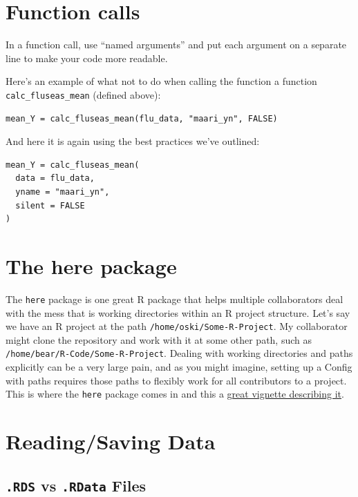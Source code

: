 \documentclass[]{book}
\begin{document}
\section{Function calls}\label{function-calls}

In a function call, use ``named arguments'' and put each argument on a
separate line to make your code more readable.

Here's an example of what not to do when calling the function a function
\texttt{calc\_fluseas\_mean} (defined above):

\begin{verbatim}
mean_Y = calc_fluseas_mean(flu_data, "maari_yn", FALSE)
\end{verbatim}

And here it is again using the best practices we've outlined:

\begin{verbatim}
mean_Y = calc_fluseas_mean(
  data = flu_data, 
  yname = "maari_yn",
  silent = FALSE
)
\end{verbatim}

\section{The here package}\label{the-here-package}

The \texttt{here} package is one great R package that helps multiple
collaborators deal with the mess that is working directories within an R
project structure. Let's say we have an R project at the path
\texttt{/home/oski/Some-R-Project}. My collaborator might clone the
repository and work with it at some other path, such as
\texttt{/home/bear/R-Code/Some-R-Project}. Dealing with working
directories and paths explicitly can be a very large pain, and as you
might imagine, setting up a Config with paths requires those paths to
flexibly work for all contributors to a project. This is where the
\texttt{here} package comes in and this a
\href{https://github.com/jennybc/here_here}{great vignette describing
it}.

\section{Reading/Saving Data}\label{readingsaving-data}

\subsection{\texorpdfstring{\texttt{.RDS} vs \texttt{.RData}
Files}{.RDS vs .RData Files}}\label{rds-vs-.rdata-files}
\end{document}
